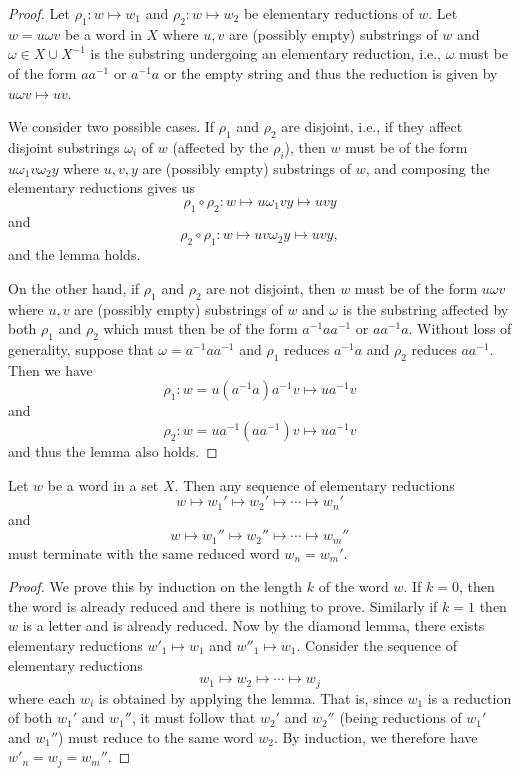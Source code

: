 \begin{proof}
    Let \(\rho_1 : w \mapsto w_1\) and \(\rho_2 : w \mapsto w_2\) be elementary
    reductions of \(w\). Let \(w = u\omega v\) be a word in \(X\) where \(u, v\)
    are (possibly empty) substrings of \(w\) and \(\omega \in X \cup X^{-1}\) is
    the substring undergoing an elementary reduction, i.e., \(\omega\) must be
    of the form \(aa^{-1}\) or \(a^{-1}a\) or the empty string and thus the
    reduction is given by \(u\omega v \mapsto uv\).

    We consider two possible cases. If \(\rho_1\) and \(\rho_2\) are disjoint,
    i.e., if they affect disjoint substrings \(\omega_i\) of \(w\) (affected by
    the \(\rho_i\)), then \(w\) must be of the form \(u\omega_1v\omega_2y\)
    where \(u, v, y\) are (possibly empty) substrings of \(w\), and composing
    the elementary reductions gives us
    \[
        \rho_1 \circ \rho_2 : w \mapsto u\omega_1vy \mapsto uvy
    \]
    and 
    \[
        \rho_2 \circ \rho_1 : w \mapsto uv\omega_2y \mapsto uvy,
    \]
    and the lemma holds.

    On the other hand, if \(\rho_1\) and \(\rho_2\) are not disjoint, then \(w\)
    must be of the form \(u\omega v\) where \(u, v\) are (possibly empty)
    substrings of \(w\) and \(\omega\) is the substring affected by both
    \(\rho_1\) and \(\rho_2\) which must then be of the form \(a^{-1}aa^{-1}\)
    or \(aa^{-1}a\). Without loss of generality, suppose that \(\omega =
    a^{-1}aa^{-1}\) and \(\rho_1\) reduces \(a^{-1}a\) and \(\rho_2\) reduces
    \(aa^{-1}\). Then we have
    \[
        \rho_1 : w = u(a^{-1}a)a^{-1}v \mapsto ua^{-1}v
    \]
    and
    \[
        \rho_2 : w = ua^{-1}(aa^{-1})v \mapsto ua^{-1}v
    \]
    and thus the lemma also holds.
\end{proof}

\begin{theorem}
    Let \(w\) be a word in a set \(X\). Then any sequence of elementary
    reductions
    \[
        w \mapsto w_1' \mapsto w_2' \mapsto \cdots \mapsto w_n'
    \]
    and
    \[
        w  \mapsto w_1'' \mapsto w_2'' \mapsto \cdots \mapsto w_m''
    \]
    must terminate with the same reduced word \(w_n = w_m'\).
\end{theorem}

\begin{proof}
    We prove this by induction on the length \(k\) of the word \(w\). If \(k =
    0\), then the word is already reduced and there is nothing to prove.
    Similarly if \(k = 1\) then \(w\) is a letter and is already reduced. Now by
    the diamond lemma, there exists elementary reductions \(w'_1 \mapsto w_1\)
    and \(w''_1 \mapsto w_1\). Consider the sequence of elementary reductions
    \[
        w_1 \mapsto w_2 \mapsto \cdots \mapsto w_j
    \]
    where each \(w_i\) is obtained by applying the lemma. That is, since \(w_1\)
    is a reduction of both \(w_1'\) and \(w_1''\), it must follow that \(w_2'\)
    and \(w_2''\) (being reductions of \(w_1'\) and \(w_1''\)) must reduce to
    the same word \(w_2\). By induction, we therefore have \(w'_n = w_j =
    w_m''\).
\end{proof}

